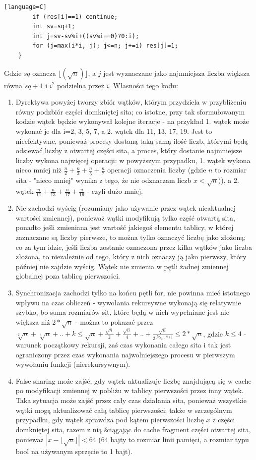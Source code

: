 \documentclass[12pt]{article}
\begin{document}
\begin {enumerate}
\begin{lstlisting}[style=mystyle, caption= Sito funkcyjne ze static schedulingiem][language=C]
		if (res[i]==1) continue;
		int sv=sq+1;
		int j=sv-sv%i+((sv%i==0)?0:i);
		for (j=max(i*i, j); j<=n; j+=i) res[j]=1;
	}
	\end{lstlisting}
	Gdzie \(sq\) oznacza \(\lfloor(\sqrt{n})\rfloor\), a \(j\) jest wyznaczane jako najmniejsza liczba większa równa \(sq+1\) i \(i^2\) podzielna przez \(i\). Własności tego kodu:
	\begin{enumerate}
		\item Dyrektywa powyżej tworzy zbiór wątków, którym przydziela w przybliżeniu równy podzbiór części domkniętej sita; co istotne, przy tak sformułowanym kodzie wątek będzie wykonywał kolejne iteracje - na przykład 1. wątek może wykonać je dla i=2, 3, 5, 7, a 2. wątek dla 11, 13, 17, 19. Jest to nieefektywne, ponieważ procesy dostaną taką samą ilość liczb, którymi będą odsiewać liczby z otwartej części sita, a proces, który dostanie najmniejsze liczby wykona najwięcej operacji: w powyższym przypadku, 1. wątek wykona nieco mniej niż \(\frac{n}{2}+\frac{n}{3}+\frac{n}{5}+\frac{n}{7}\) operacji oznaczenia liczby (gdzie \(n\) to rozmiar sita - "nieco mniej" wynika z tego, że nie odznaczam liczb \(x<\sqrt{n})\)), a 2. wątek \(\frac{n}{11}+\frac{n}{13}+\frac{n}{17}+\frac{n}{19}\) - czyli dużo mniej.
		\item Nie zachodzi wyścig (rozumiany jako używanie przez wątek nieaktualnej wartości zmiennej), ponieważ wątki modyfikują tylko część otwartą sita, ponadto jeśli zmieniana jest wartość jakiegoś elementu tablicy, w której zaznaczane są liczby pierwsze, to można tylko oznaczyć liczbę jako złożoną; co za tym idzie, jeśli liczba zostanie oznaczona przez kilka wątków jako liczba złożona, to niezależnie od tego, który z nich oznaczy ją jako pierwszy, który później nie zajdzie wyścig. Wątek nie zmienia w pętli żadnej zmiennej globalnej poza tablicą pierwszości.
		\item Synchronizacja zachodzi tylko na końcu pętli for, nie powinna mieć istotnego wpływu na czas obliczeń - wywołania rekursywne wykonają się relatywnie szybko, bo suma rozmiarów sit, które będą w nich wypełniane jest nie większa niż \(2*\sqrt{n}\) - można to pokazać przez \(\sqrt[2]{n}+\sqrt[4]{n}+..+k\le\sqrt{n}+\frac{\sqrt{n}}{2}+\frac{\sqrt{n}}{4}+..+\frac{\sqrt{n}}{2^{\lfloor log_2(n) \rfloor}}\le 2*\sqrt{n}\), gdzie \(k \le 4\) - warunek początkowy rekursji, zaś czas wykonania całego sita i tak jest ograniczony przez czas wykonania najwolniejszego procesu w pierwszym wywołaniu funkcji (nierekursywnym).
		\item False sharing może zajść, gdy wątek aktualizuje liczbę znajdującą się w cache po modyfikacji zmiennej w pobliżu w tablicy pierwszości przez inny wątek. Taka sytuacja może zajść przez cały czas działania sita, ponieważ wszystkie wątki mogą aktualizować całą tablicę pierwszości; także w szczególnym przypadku, gdy wątek sprawdza pod kątem pierwszości liczbę \(x\) z części domkniętej sita, razem z nią ściągając do cache fragment części otwartej sita, ponieważ \(|x-\lfloor\sqrt{n}\rfloor|<64\) (64 bajty to rozmiar linii pamięci, a rozmiar typu bool na używanym sprzęcie to 1 bajt).

\end{enumerate}
\end{enumerate}
\end{document}
